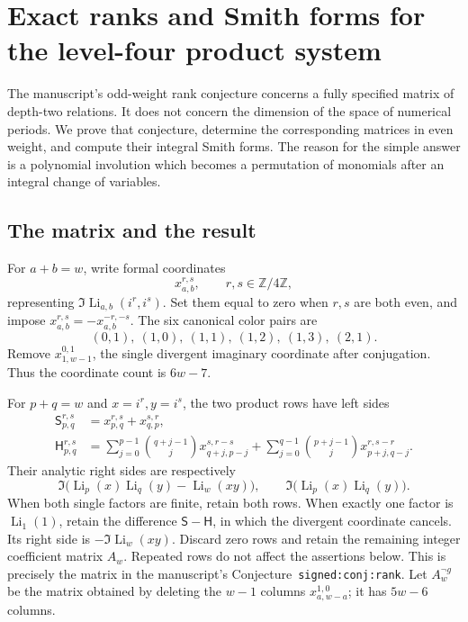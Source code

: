 \section{Exact ranks and Smith forms for the level-four product system}
\label{newrank:sec:main}

The manuscript's odd-weight rank conjecture concerns a fully specified
matrix of depth-two relations.  It does not concern the dimension of the
space of numerical periods.  We prove that conjecture, determine the
corresponding matrices in even weight, and compute their integral Smith
forms.  The reason for the simple answer is a polynomial involution which
becomes a permutation of monomials after an integral change of variables.

\subsection{The matrix and the result}

For $a+b=w$, write formal coordinates
\[
 x_{a,b}^{r,s},\qquad r,s\in\mathbb Z/4\mathbb Z,
\]
representing $\Im\operatorname{Li}_{a,b}(i^r,i^s)$.  Set them equal to zero
when $r,s$ are both even, and impose
$x_{a,b}^{r,s}=-x_{a,b}^{-r,-s}$.  The six canonical color pairs are
\begin{equation}\label{newrank:eq:pairs}
 (0,1),\ (1,0),\ (1,1),\ (1,2),\ (1,3),\ (2,1).
\end{equation}
Remove $x_{1,w-1}^{0,1}$, the single divergent imaginary coordinate after
conjugation.  Thus the coordinate count is $6w-7$.

For $p+q=w$ and $x=i^r,y=i^s$, the two product rows have left sides
\begin{align}
 \mathsf S_{p,q}^{r,s}
 &=x_{p,q}^{r,s}+x_{q,p}^{s,r},\label{newrank:eq:stuffle}\\
 \mathsf H_{p,q}^{r,s}
 &=\sum_{j=0}^{p-1}\binom{q+j-1}{j}x_{q+j,p-j}^{s,r-s}
  +\sum_{j=0}^{q-1}\binom{p+j-1}{j}x_{p+j,q-j}^{r,s-r}.
 \label{newrank:eq:shuffle}
\end{align}
Their analytic right sides are respectively
\[
 \Im\bigl(\operatorname{Li}_p(x)\operatorname{Li}_q(y)
           -\operatorname{Li}_w(xy)\bigr),\qquad
 \Im\bigl(\operatorname{Li}_p(x)\operatorname{Li}_q(y)\bigr).
\]
When both single factors are finite, retain both rows.  When exactly one
factor is $\operatorname{Li}_1(1)$, retain the difference
$\mathsf S-\mathsf H$, in which the divergent coordinate cancels.
Its right side is $-\Im\operatorname{Li}_w(xy)$.
Discard zero rows and retain the remaining integer coefficient matrix
$A_w$.  Repeated rows do not affect the assertions below.  This is
precisely the matrix in the manuscript's Conjecture~\texttt{signed:conj:rank}.
Let $A_w^{\neg g}$ be the matrix obtained by deleting the $w-1$ columns
$x_{a,w-a}^{1,0}$; it has $5w-6$ columns.

